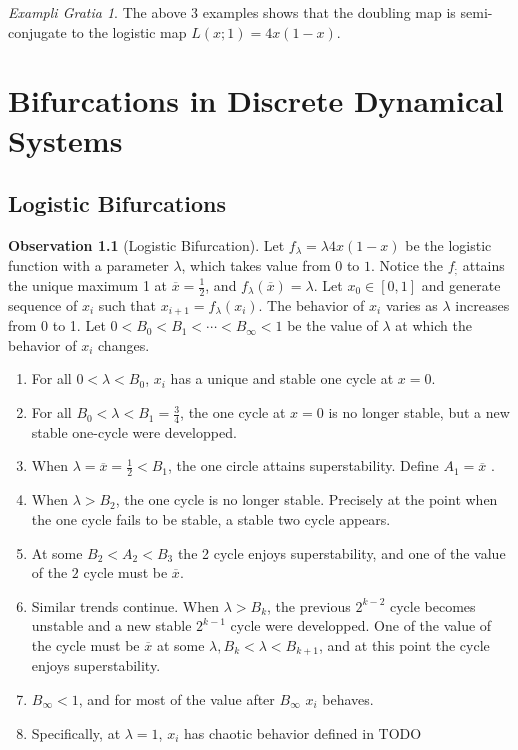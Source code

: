 \documentclass{report}
\theoremstyle{definition}
\theoremstyle{definition}
\newtheorem{observation}[thm]{Observation}
\theoremstyle{remark}
\newtheorem{example}[thm]{Exampli Gratia}
\newcommand{\mx}{\overline{x}}
\begin{document}
\begin{example}\label{ex_logistic_at_4}\label{ex_logistic_and_doubling}
	The above 3 examples shows that the doubling map is semi-conjugate to the logistic map $L(x;1) = 4x(1-x)$.
\end{example}

\chapter{Bifurcations in Discrete Dynamical Systems}

\section{Logistic Bifurcations}

\begin{observation}[Logistic Bifurcation]\label{th:logistic_bifurcation}
	Let $f_{\lambda} = \lambda 4x(1-x) $ be the logistic function with a parameter $\lambda$, which takes value from $0$ to $1$. 
	Notice the $f_{;}$ attains the unique maximum 1 at $\mx = \frac{1}{2}$, and $f_{\lambda}(\mx) = \lambda$.
	Let $x_0 \in [0,1]$ and generate sequence of $x_i$ such that $x_{i+1} = f_{\lambda}(x_i)$.
	The behavior of $x_i$ varies as $\lambda$ increases from 0 to 1. Let $0 < B_0 < B_1 < \cdots < B_{\infty} < 1$ be the value of $\lambda$ at which the behavior of $x_i$ changes.

	\begin{enumerate}
		\item For all $0 < \lambda < B_0$, $x_i$ has a unique and stable one cycle at $x=0$.
		\item For all $B_0 <\lambda < B_1 = \frac{3}{4}$, the one cycle at $x=0$ is no longer stable, but a new stable one-cycle were developped.
		\item When $\lambda = \mx = \frac{1}{2}< B_1$, the one circle attains superstability. Define $A_1 = \mx$ .
		\item When $\lambda > B_2$, the one cycle is no longer stable. Precisely at the point when the one cycle fails to be stable, a stable two cycle appears.
		\item At some $B_2 <A_2 < B_3$ the 2 cycle enjoys superstability, and one of the value of the $2$ cycle must be $\mx$.
		\item Similar trends continue. When $\lambda > B_k$, the previous $2^{k-2}$ cycle becomes unstable and a new stable $2^{k-1}$ cycle were developped. One of the value of the cycle must be $\mx$ at some $\lambda, B_k <\lambda < B_{k+1}$, and at this point the cycle enjoys superstability.
		\item $B_{\infty} < 1$, and for most of the value after $B_{\infty}$ $x_i$ behaves. 
		\item Specifically, at $\lambda = 1$, $x_i$ has chaotic behavior defined in TODO
	\end{enumerate}

\end{observation}
\end{document}
